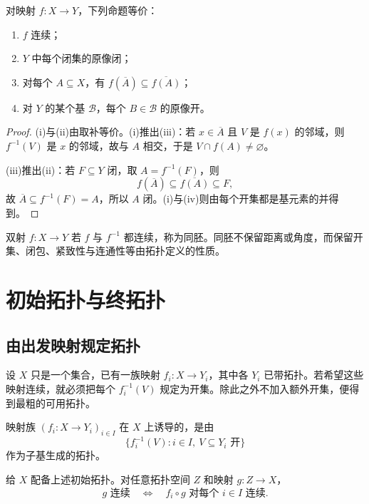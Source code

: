 \begin{proposition}[连续性的若干等价形式]
\label{prop:topological-continuity-equivalences}
对映射 \(f:X\to Y\)，下列命题等价：
\begin{enumerate}[label=\textup{(\roman*)}]
 \item \(f\) 连续；
 \item \(Y\) 中每个闭集的原像闭；
 \item 对每个 \(A\subseteq X\)，有 \(f(\overline A)\subseteq\overline{f(A)}\)；
 \item 对 \(Y\) 的某个基 \(\mathcal B\)，每个 \(B\in\mathcal B\) 的原像开。
\end{enumerate}
\end{proposition}

\begin{proof}
(i)与(ii)由取补等价。(i)推出(iii)：若 \(x\in\overline A\) 且 \(V\) 是 \(f(x)\) 的邻域，则 \(f^{-1}(V)\) 是 \(x\) 的邻域，故与 \(A\) 相交，于是 \(V\cap f(A)\ne\varnothing\)。

(iii)推出(ii)：若 \(F\subseteq Y\) 闭，取 \(A=f^{-1}(F)\)，则
\[
 f(\overline A)\subseteq\overline{f(A)}\subseteq F,
\]
故 \(\overline A\subseteq f^{-1}(F)=A\)，所以 \(A\) 闭。(i)与(iv)则由每个开集都是基元素的并得到。
\end{proof}

双射 \(f:X\to Y\) 若 \(f\) 与 \(f^{-1}\) 都连续，称为同胚。同胚不保留距离或角度，而保留开集、闭包、紧致性与连通性等由拓扑定义的性质。

\section{初始拓扑与终拓扑}

\subsection{由出发映射规定拓扑}

设 \(X\) 只是一个集合，已有一族映射 \(f_i:X\to Y_i\)，其中各 \(Y_i\) 已带拓扑。若希望这些映射连续，就必须把每个 \(f_i^{-1}(V)\) 规定为开集。除此之外不加入额外开集，便得到最粗的可用拓扑。

\begin{definition}[初始拓扑]
映射族 \((f_i:X\to Y_i)_{i\in I}\) 在 \(X\) 上诱导的，是由
\[
 \{f_i^{-1}(V):i\in I,\ V\subseteq Y_i\text{ 开}\}
\]
作为子基生成的拓扑。
\end{definition}

\begin{theorem}[初始拓扑的泛性质]
\label{thm:initial-topology-universal-property}
给 \(X\) 配备上述初始拓扑。对任意拓扑空间 \(Z\) 和映射 \(g:Z\to X\)，
\[
 g\text{ 连续}
 \quad\Longleftrightarrow\quad
 f_i\circ g\text{ 对每个 }i\in I\text{ 连续}.
\]
\end{theorem}

